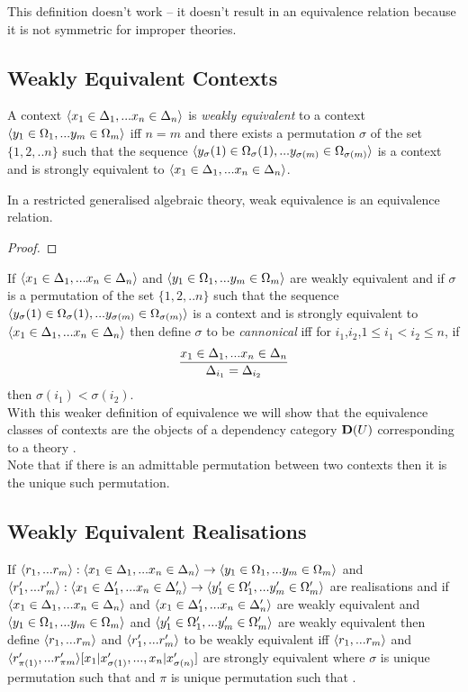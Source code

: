 \documentclass[10pt,a4paper]{scrartcl}
\begin{document}
This definition doesn't work -- it doesn't result in an equivalence relation because it is not symmetric for improper theories.

\subsection{Weakly Equivalent Contexts}
\begin{definition}
A context $\langle x_1 \in \Delta_1,... x_{n} \in \Delta_{n}\rangle$ 
is \textit{weakly equivalent} to a context $\langle y_1 \in \Omega_1,... y_{m} \in \Omega_{m}\rangle$  iff $n=m$ and there exists a permutation $\sigma$ of the set $\{1,2,..n\}$
such that the sequence 
$\langle y_\sigma(1) \in \Omega_\sigma(1),... y_{\sigma(m)} \in \Omega_{\sigma(m)}\rangle$
is a context and 
is strongly equivalent to $\langle x_1 \in \Delta_1,... x_{n} \in \Delta_{n}\rangle$.
\end{definition}
\begin{lemma}
In a restricted generalised algebraic theory, weak equivalence is an
equivalence relation.
\end{lemma}
\begin{proof}

\end{proof}

\noindent 
If $\langle x_1 \in \Delta_1,... x_{n} \in \Delta_{n}\rangle$ 
and $\langle y_1 \in \Omega_1,... y_{m} \in \Omega_{m}\rangle$ are weakly equivalent 
and if $\sigma$ is a permutation of the set $\{1,2,..n\}$
such that the sequence 
$\langle y_\sigma(1) \in \Omega_\sigma(1),... y_{\sigma(m)} \in \Omega_{\sigma(m)}\rangle$
is a context and 
is strongly equivalent to $\langle x_1 \in \Delta_1,... x_{n} \in \Delta_{n}\rangle$
then define $\sigma$ to be \textit{cannonical} iff
for $i_1$,$i_2$,$1 \leq i_1  < i_2 \leq n$, if 
$$
\frac{x_1 \in \Delta_1,... x_{n} \in \Delta_{n}}{\Delta_{i_1}=\Delta_{i_2}}
$$
then $\sigma(i_1) < \sigma(i_2)$.\\

With this weaker definition of equivalence we will show that the 
equivalence classes of contexts are the objects of a dependency category
$\mathbf{D}(U)$ corresponding to a theory \gat. \\
\noindent
Note that if there is an admittable  permutation between two contexts then it is the unique such permutation. 

\subsection{Weakly Equivalent Realisations}
If $\langle r_1,...r_m\rangle: \langle x_1 \in \Delta_1,... x_{n} \in \Delta_{n}\rangle \rightarrow \langle y_1 \in \Omega_1,... y_{m} \in \Omega_{m}\rangle$ and
$\langle r'_1,...r'_m\rangle: \langle x_1 \in \Delta'_1,... x_{n} \in \Delta'_{n}\rangle \rightarrow \langle y'_1 \in \Omega'_1,... y'_{m} \in \Omega'_{m}\rangle$ are realisations 
and if $\langle x_1 \in \Delta_1,... x_{n} \in \Delta_{n}\rangle$ and 
$\langle x_1 \in \Delta'_1,... x_{n} \in \Delta'_{n}\rangle$ are weakly equivalent and 
$\langle y_1 \in \Omega_1,... y_{m} \in \Omega_{m}\rangle$ and $\langle y'_1 \in \Omega'_1,... y'_{m} \in \Omega'_{m}\rangle$ are weakly equivalent then
define $\langle r_1,...r_m\rangle$ and $\langle r'_1,...r'_m\rangle$ to be weakly equivalent 
iff 
$\langle r_1,...r_m\rangle$
and
$\langle r'_{\pi(1)},...r'_{\pi{m}}\rangle[x_1|x'_{\sigma(1)},...,x_n|x'_{\sigma(n)}]$
are strongly equivalent
where
$\sigma$ is unique permutation such that 
and $\pi$ is unique permutation such that .
\end{document}
